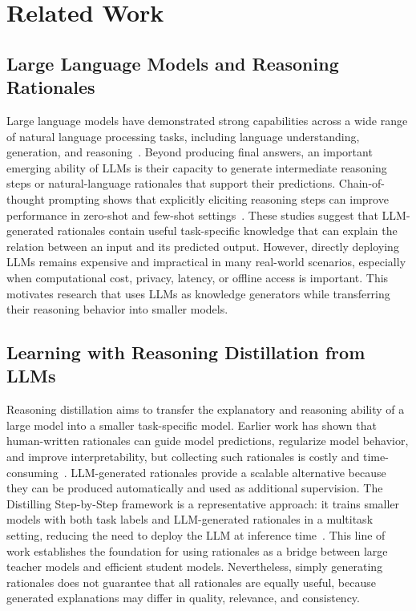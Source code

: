 \section{Related Work}
\label{sec:related-work}

\subsection{Large Language Models and Reasoning Rationales}

Large language models have demonstrated strong capabilities across a wide range of natural language processing tasks, including language understanding, generation, and reasoning~\cite{brown2020language,chowdhery2022palm,openai2023gpt4}. Beyond producing final answers, an important emerging ability of LLMs is their capacity to generate intermediate reasoning steps or natural-language rationales that support their predictions. Chain-of-thought prompting shows that explicitly eliciting reasoning steps can improve performance in zero-shot and few-shot settings~\cite{wei2022chain,kojima2022large}. These studies suggest that LLM-generated rationales contain useful task-specific knowledge that can explain the relation between an input and its predicted output. However, directly deploying LLMs remains expensive and impractical in many real-world scenarios, especially when computational cost, privacy, latency, or offline access is important. This motivates research that uses LLMs as knowledge generators while transferring their reasoning behavior into smaller models.

\subsection{Learning with Reasoning Distillation from LLMs}

Reasoning distillation aims to transfer the explanatory and reasoning ability of a large model into a smaller task-specific model. Earlier work has shown that human-written rationales can guide model predictions, regularize model behavior, and improve interpretability, but collecting such rationales is costly and time-consuming~\cite{zaidan2007using,camburu2018esnli,rajani2019cosmos}. LLM-generated rationales provide a scalable alternative because they can be produced automatically and used as additional supervision. The Distilling Step-by-Step framework is a representative approach: it trains smaller models with both task labels and LLM-generated rationales in a multitask setting, reducing the need to deploy the LLM at inference time~\cite{hsieh2023distilling}. This line of work establishes the foundation for using rationales as a bridge between large teacher models and efficient student models. Nevertheless, simply generating rationales does not guarantee that all rationales are equally useful, because generated explanations may differ in quality, relevance, and consistency.

